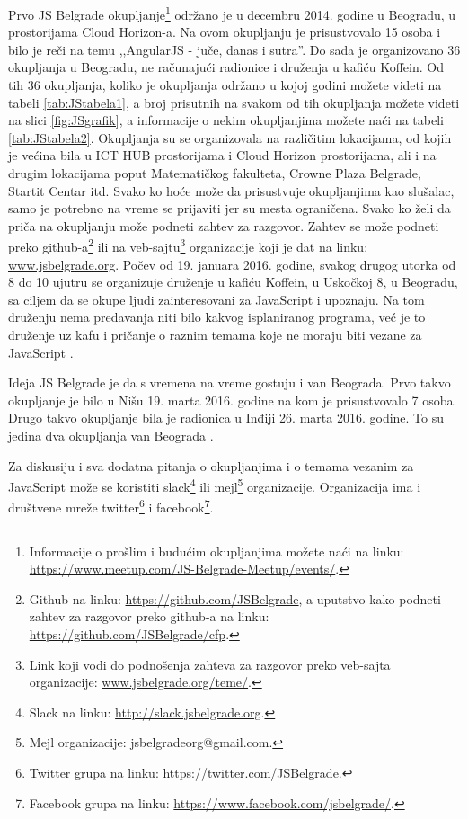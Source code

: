 \documentclass[a4paper]{article}
\begin{document}
{Prvo JS Belgrade okupljanje\footnote{Informacije o prošlim i budućim okupljanjima možete naći na linku: \url{https://www.meetup.com/JS-Belgrade-Meetup/events/}.} održano je u decembru 2014. godine u Beogradu, u prostorijama Cloud Horizon-a. Na ovom okupljanju je prisustvovalo 15 osoba i bilo je reči na temu ,,AngularJS - juče, danas i sutra''. Do sada je organizovano 36 okupljanja u Beogradu, ne računajući radionice i druženja u kafiću Koffein. Od tih 36 okupljanja, koliko je okupljanja održano u kojoj godini možete videti na tabeli \ref{tab:JStabela1}, a broj prisutnih na svakom od tih okupljanja možete videti na slici \ref{fig:JSgrafik}, a informacije o nekim okupljanjima možete naći na tabeli \ref{tab:JStabela2}. Okupljanja su se organizovala na različitim lokacijama, od kojih je većina bila u ICT HUB prostorijama \cite{aboutICT} i Cloud Horizon prostorijama, ali i na drugim lokacijama poput Matematičkog fakulteta, Crowne Plaza Belgrade, Startit Centar \cite{aboutStarit} itd. Svako ko hoće može da prisustvuje okupljanjima kao slušalac, samo je potrebno na vreme se prijaviti jer su mesta ograničena. Svako ko želi da priča na okupljanju može podneti zahtev za razgovor. Zahtev se može podneti preko github-a\footnote{Github na linku: \url{https://github.com/JSBelgrade}, a uputstvo kako podneti zahtev za razgovor preko github-a na linku: \url{https://github.com/JSBelgrade/cfp}.} ili na veb-sajtu\footnote{Link koji vodi do podnošenja zahteva za razgovor preko veb-sajta organizacije: \url{www.jsbelgrade.org/teme/}.} organizacije koji je dat na linku: \url{www.jsbelgrade.org}. Počev od 19. januara 2016. godine, svakog drugog utorka od 8 do 10 ujutru  se organizuje druženje u kafiću Koffein, u Uskočkoj 8, u Beogradu, sa ciljem da se okupe ljudi zainteresovani za JavaScript i upoznaju. Na tom druženju nema predavanja niti bilo kakvog isplaniranog programa, već je to druženje uz kafu i pričanje o raznim temama koje ne moraju biti vezane za JavaScript \cite{JS_Belgrade_meetup_pocetna}.

Ideja JS Belgrade je da s vremena na vreme gostuju i van Beograda. Prvo takvo okupljanje je bilo u Nišu 19. marta 2016. godine na kom je prisustvovalo 7 osoba. Drugo takvo okupljanje bila je radionica u Inđiji 26. marta 2016. godine. To su jedina dva okupljanja van Beograda \cite{JS_Belgrade_meetup_pocetna}.

Za diskusiju i sva dodatna pitanja o okupljanjima i o temama vezanim za JavaScript može se koristiti slack\footnote{Slack na linku: \url{http://slack.jsbelgrade.org}.} ili mejl\footnote{Mejl organizacije: jsbelgradeorg@gmail.com.} organizacije. Organizacija ima i društvene mreže twitter\footnote{Twitter grupa na linku: \url{https://twitter.com/JSBelgrade}.} i facebook\footnote{Facebook grupa na linku: \url{https://www.facebook.com/jsbelgrade/}.}.

}
\end{document}
